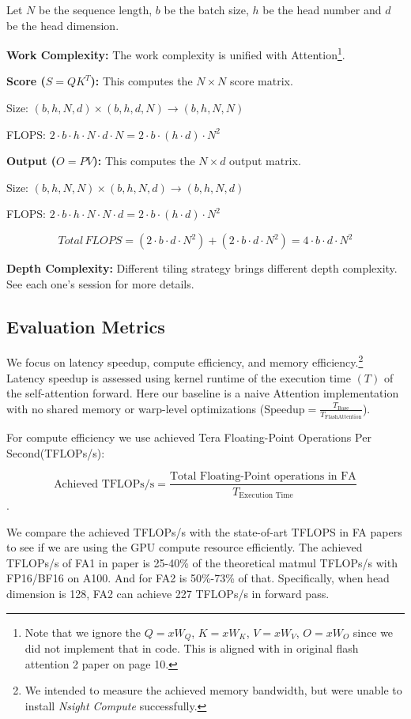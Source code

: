 \documentclass[11pt]{article}
\renewcommand\cite{\citep}  %
\begin{document}
Let $N$ be the sequence length, $b$ be the batch size, $h$ be the head number and $d$ be the head dimension.

\textbf{Work Complexity: } The work complexity is unified with Attention\footnote{Note that we ignore the $Q=xW_Q$, $K=xW_K$, $V=xW_V$, $O=xW_O$ since we did not implement that in code. This is aligned with in original flash attention 2 paper on page 10.}.


\textbf{Score ($S = QK^T$):} This computes the $N \times N$ score matrix.

Size: $(b, h, N, d) \times (b, h, d, N) \rightarrow (b, h, N, N)$

FLOPS: $2 \cdot b \cdot h \cdot N \cdot d \cdot N = 2 \cdot b \cdot (h \cdot d) \cdot N^2$

\textbf{Output ($O = PV$):} This computes the $N \times d$ output matrix.

Size: $(b, h, N, N) \times (b, h, N, d) \rightarrow (b, h, N, d)$

FLOPS: $2 \cdot b \cdot h \cdot N \cdot N \cdot d = 2 \cdot b \cdot (h \cdot d) \cdot N^2$

$$ Total\, FLOPS = (2 \cdot b \cdot d \cdot N^2) + (2 \cdot b \cdot d \cdot N^2) = 4 \cdot b \cdot d \cdot N^2 $$


\textbf{Depth Complexity: } Different tiling strategy brings different depth complexity. See each one's session for more details.


\subsection{Evaluation Metrics}
We focus on latency speedup, compute efficiency, and memory efficiency.\footnote{We intended to measure the achieved memory bandwidth, but were unable to install \textit{Nsight Compute} successfully.} Latency speedup is assessed using kernel runtime of the execution time $(T)$ of the self-attention forward. Here our baseline is a naive Attention implementation with no shared memory or warp-level optimizations ($\text{Speedup} = \frac{T_{\text{Base}}}{T_{\text{FlashAttention}}}$).

For compute efficiency we use achieved Tera Floating-Point Operations Per Second(TFLOPs/s): 

$$\text{Achieved TFLOPs/s} = \frac{\text{Total Floating-Point operations in FA}}{T_{\text{Execution Time}}}$$.

We compare the achieved TFLOPs/s with the state-of-art TFLOPS in FA papers to see if we are using the GPU compute resource efficiently. The achieved TFLOPs/s of FA1 in paper is 25-40\% of the theoretical matmul TFLOPs/s with FP16/BF16 on A100. And for FA2 is 50\%-73\% of that\cite{dao2023flashattention}. Specifically, when head dimension is 128, FA2 can achieve 227 TFLOPs/s in forward pass.
\end{document}
